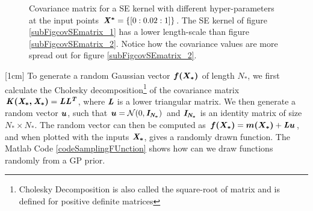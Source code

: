 \begin{figure}[!ht]
  \centering
    \quad
{}\quad
  
       \caption{Covariance matrix for a SE kernel with different hyper-parameters at the input points $\bm{\mathit{X^{*}}} = \{[0:0.02:1]\}$. The SE kernel of figure \ref{subFigcovSEmatrix_1} has a lower length-scale than figure \ref{subFigcovSEmatrix_2}. Notice how the covariance values are more spread out for figure \ref{subFigcovSEmatrix_2}.}\label{figGPCovarianceMatrix}
\end{figure}

[1cm]
To generate a random Gaussian vector $\boldsymbol{f(X_{*})}$ of length $N_{*}$, we first calculate the Cholesky decomposition\footnote{Cholesky Decomposition is also called the square-root of matrix and is defined for positive definite matrices} of the covariance matrix $\bm{\mathit{K(X_{*}, X_{*})}} = \bm{\mathit{L}}\bm{\mathit{L^{T}}}$, where $\bm{\mathit{L}}$ is a lower triangular matrix. We then generate a random vector $\boldsymbol{u}$, such that $\boldsymbol{u} = \mathcal{N}(0, \bm{\mathit{I_{N_*}}})$ and $\bm{\mathit{I_{N_*}}}$ is an identity matrix of size $N_{*} \times N_{*}$.  The random vector can then be computed as $\boldsymbol{f(X_{*})} = \boldsymbol{m(X_{*})} + \bm{\mathit{L}}\boldsymbol{u}$, and when plotted with the inputs $\bm{\mathit{X_{*}}}$, gives a randomly drawn function. The Matlab Code \ref{codeSamplingFUnction} shows how can we draw functions randomly from a GP prior.

